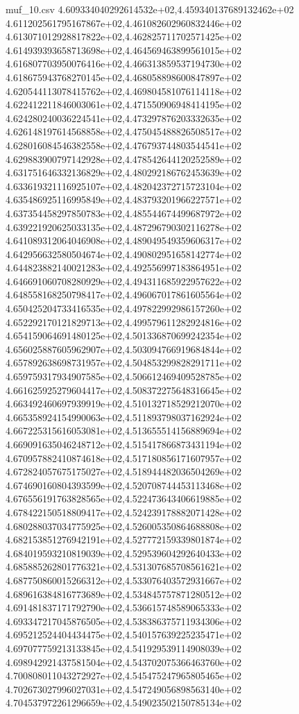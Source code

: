 \begin{filecontents*}{muf_10.csv}
4.609334040292614532e+02,4.459340137689132462e+02
4.611202561795167867e+02,4.461082602960832446e+02
4.613071012928817822e+02,4.462825711702571425e+02
4.614939393658713698e+02,4.464569463899561015e+02
4.616807703950076416e+02,4.466313859537194730e+02
4.618675943768270145e+02,4.468058898600847897e+02
4.620544113078415762e+02,4.469804581076114118e+02
4.622412211846003061e+02,4.471550906948414195e+02
4.624280240036224541e+02,4.473297876203332635e+02
4.626148197614568858e+02,4.475045488826508517e+02
4.628016084546382558e+02,4.476793744803544541e+02
4.629883900797142928e+02,4.478542644120252589e+02
4.631751646332136829e+02,4.480292186762453639e+02
4.633619321116925107e+02,4.482042372715723104e+02
4.635486925116995849e+02,4.483793201966227571e+02
4.637354458297850783e+02,4.485544674499687972e+02
4.639221920625033135e+02,4.487296790302116278e+02
4.641089312064046908e+02,4.489049549359606317e+02
4.642956632580504674e+02,4.490802951658142774e+02
4.644823882140021283e+02,4.492556997183864951e+02
4.646691060708280929e+02,4.494311685922957622e+02
4.648558168250798417e+02,4.496067017861605564e+02
4.650425204733416535e+02,4.497822992986157260e+02
4.652292170121829713e+02,4.499579611282924816e+02
4.654159064691480125e+02,4.501336870699242354e+02
4.656025887605962907e+02,4.503094766919684844e+02
4.657892638698731957e+02,4.504853299828291711e+02
4.659759317934907585e+02,4.506612469409528785e+02
4.661625925279604417e+02,4.508372275648316645e+02
4.663492460697939919e+02,4.510132718529212070e+02
4.665358924154990063e+02,4.511893798037162924e+02
4.667225315616053081e+02,4.513655514156889694e+02
4.669091635046248712e+02,4.515417866873431194e+02
4.670957882410874618e+02,4.517180856171607957e+02
4.672824057675175027e+02,4.518944482036504269e+02
4.674690160804393599e+02,4.520708744453113468e+02
4.676556191763828565e+02,4.522473643406619885e+02
4.678422150518809417e+02,4.524239178882071428e+02
4.680288037034775925e+02,4.526005350864688808e+02
4.682153851276942191e+02,4.527772159339801874e+02
4.684019593210819039e+02,4.529539604292640433e+02
4.685885262801776321e+02,4.531307685708561621e+02
4.687750860015266312e+02,4.533076403572931667e+02
4.689616384816773689e+02,4.534845757871280512e+02
4.691481837171792790e+02,4.536615748589065333e+02
4.693347217045876505e+02,4.538386375711934306e+02
4.695212524404434475e+02,4.540157639225235471e+02
4.697077759213133845e+02,4.541929539114908039e+02
4.698942921437581504e+02,4.543702075366463760e+02
4.700808011043272927e+02,4.545475247965805465e+02
4.702673027996027031e+02,4.547249056898563140e+02
4.704537972261296659e+02,4.549023502150785134e+02

\end{filecontents*}

